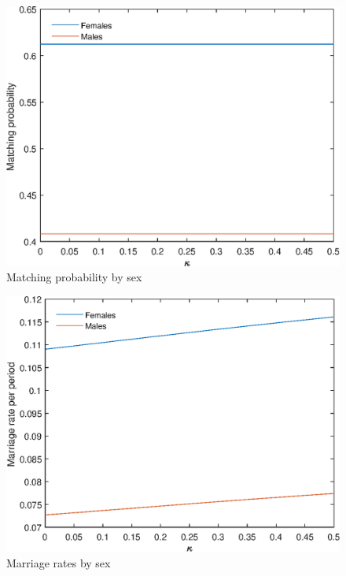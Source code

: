 \documentclass[12pt]{article}
\begin{document}
\begin{figure}
	\centering
	\caption{Matching probability by sex}
	\includegraphics{Graphs/match_prob_kappa_ex1.eps}
\end{figure}

\begin{figure}
	\centering
	\caption{Marriage rates by sex}
	\includegraphics{Graphs/marr_rates_kappa_ex1.eps}
\end{figure}
\end{document}
